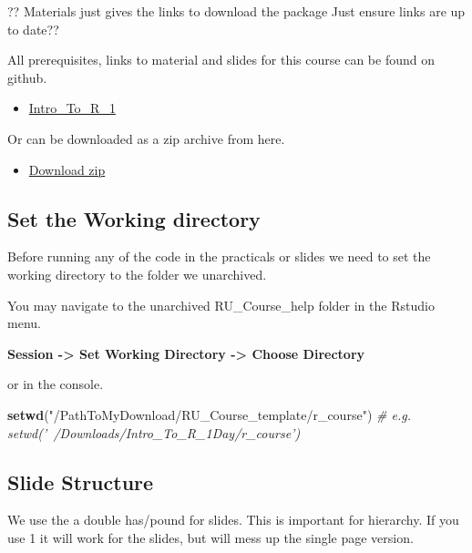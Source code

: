 \documentclass[
]{article}
\newenvironment{Shaded}{\begin{snugshade}}{\end{snugshade}}
\newcommand{\CommentTok}[1]{\textcolor[rgb]{0.56,0.35,0.01}{\textit{#1}}}
\newcommand{\KeywordTok}[1]{\textcolor[rgb]{0.13,0.29,0.53}{\textbf{#1}}}
\newcommand{\NormalTok}[1]{#1}
\newcommand{\StringTok}[1]{\textcolor[rgb]{0.31,0.60,0.02}{#1}}
\providecommand{\tightlist}{%
  \setlength{\itemsep}{0pt}\setlength{\parskip}{0pt}}
\begin{document}
?? Materials just gives the links to download the package Just ensure
links are up to date??

All prerequisites, links to material and slides for this course can be
found on github.

\begin{itemize}
\tightlist
\item
  \href{https://rockefelleruniversity.github.io/Intro_To_R_1Day/}{Intro\_To\_R\_1}
\end{itemize}

Or can be downloaded as a zip archive from here.

\begin{itemize}
\tightlist
\item
  \href{https://github.com/rockefelleruniversity/Intro_To_R_1Day/zipball/master}{Download
  zip}
\end{itemize}

\hypertarget{set-the-working-directory}{%
\subsection{Set the Working directory}\label{set-the-working-directory}}

Before running any of the code in the practicals or slides we need to
set the working directory to the folder we unarchived.

You may navigate to the unarchived RU\_Course\_help folder in the
Rstudio menu.

\textbf{Session -\textgreater{} Set Working Directory -\textgreater{}
Choose Directory}

or in the console.

\begin{Shaded}
\begin{Highlighting}[]
\KeywordTok{setwd}\NormalTok{(}\StringTok{"/PathToMyDownload/RU_Course_template/r_course"}\NormalTok{)}
\CommentTok{# e.g. setwd('~/Downloads/Intro_To_R_1Day/r_course')}
\end{Highlighting}
\end{Shaded}

\hypertarget{slide-structure}{%
\subsection{Slide Structure}\label{slide-structure}}

We use the a double has/pound for slides. This is important for
hierarchy. If you use 1 it will work for the slides, but will mess up
the single page version.
\end{document}
